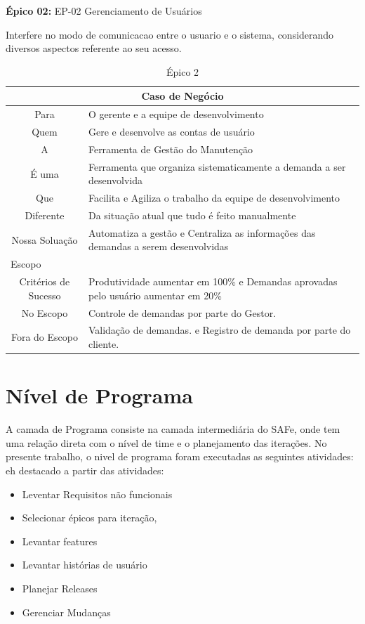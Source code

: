 \textbf{Épico 02:} EP-02 Gerenciamento de Usuários

Interfere no modo de comunicacao entre o usuario e o sistema, considerando diversos aspectos referente ao seu acesso.

\begin{table}[H]
\centering
\caption{Épico 2}
\label{epic:segundo}
\begin{tabular}{|c| p{13cm} |}
\hline
\multicolumn{2}{|m{4cm}|}{\textbf{Caso de Negócio}} \\ \hline
  Para   &   O gerente e a equipe de desenvolvimento        \\ \hline
  Quem         &    Gere e desenvolve as contas de usuário        \\ \hline
    A       &     Ferramenta de Gestão do Manutenção    \\ \hline
      É uma     &    Ferramenta que organiza sistematicamente a demanda a ser desenvolvida \\ \hline
      Que     &     Facilita e Agiliza o trabalho da equipe de desenvolvimento \\ \hline
      Diferente   &     Da situação atual que tudo é feito manualmente     \\ \hline
      Nossa Soluação  &   Automatiza a gestão e Centraliza as informações das demandas a serem desenvolvidas    \\ \hline
\multicolumn{2}{|l|}{Escopo} \\ \hline
Critérios de Sucesso  &  Produtividade aumentar em 100\% e Demandas aprovadas pelo usuário aumentar em 20\%    \\ \hline
No Escopo & Controle de demandas por parte do Gestor. \\ \hline
Fora do Escopo  & Validação de demandas. e Registro de demanda por parte do cliente.     \\ \hline
\end{tabular}
\end{table}

\section{Nível de Programa}

A camada de Programa consiste na camada intermediária do SAFe, onde tem uma relação
direta com o nível de time e o planejamento das iterações. No presente trabalho,
o nivel de programa foram executadas as seguintes atividades: eh destacado a partir das atividades:

\begin{itemize}
  \item Leventar Requisitos não funcionais
  \item Selecionar épicos para iteração,
  \item Levantar features
  \item Levantar histórias de usuário
  \item Planejar Releases
  \item Gerenciar Mudanças
\end{itemize}

